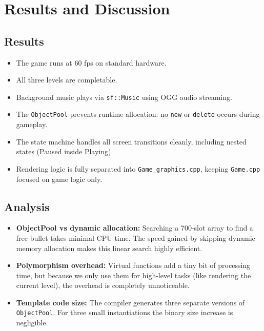 \documentclass[11pt]{article}
\begin{document}
\clearpage
\section{Results and Discussion}

\subsection{Results}

\begin{itemize}
    \item The game runs at 60 fps on standard hardware.
    \item All three levels are completable.
    \item Background music plays via \texttt{sf::Music} using OGG audio streaming.
    \item The \texttt{ObjectPool} prevents runtime allocation: no \texttt{new}
          or \texttt{delete} occurs during gameplay.
    \item The state machine handles all screen transitions cleanly, including
          nested states (Paused inside Playing).
    \item Rendering logic is fully separated into \texttt{Game\_graphics.cpp},
          keeping \texttt{Game.cpp} focused on game logic only.
\end{itemize}

\subsection{Analysis}

\begin{itemize}
    \item \textbf{ObjectPool vs dynamic allocation:} Searching a 700-slot array to find a free bullet takes minimal CPU time. The speed gained by skipping dynamic memory allocation makes this linear search highly efficient.

    \item \textbf{Polymorphism overhead:} Virtual functions add a tiny bit of processing time, but because we only use them for high-level tasks (like rendering the current level), the overhead is completely unnoticeable.

    \item \textbf{Template code size:} The compiler generates three separate
          versions of \texttt{ObjectPool}. For three small instantiations
          the binary size increase is negligible.
\end{itemize}
\end{document}

